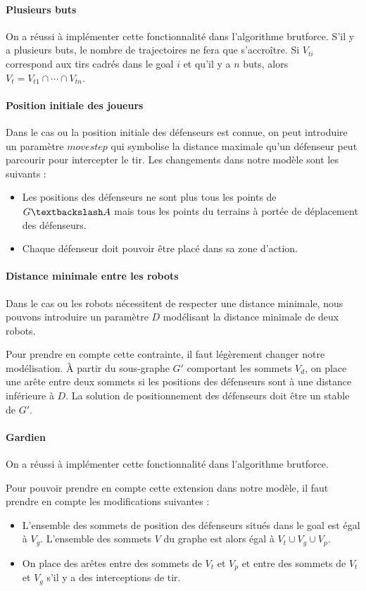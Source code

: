 \documentclass[12pt]{article}
\begin{document}
\paragraph{Plusieurs buts}
On a réussi à implémenter cette fonctionnalité dans l'algorithme brutforce. S'il y a plusieurs buts, le nombre de trajectoires ne fera que s'accroître. Si $V_{ti}$ correspond aux tirs cadrés dans le goal $i$ et qu'il y a $n$ buts, alors $V_t = V_{t1} \cap \cdots \cap V_{tn}$.


\paragraph{Position initiale des joueurs}
Dans le cas ou la position initiale des défenseurs est connue, on peut introduire un paramètre $movestep$ qui symbolise la distance maximale qu'un défenseur peut parcourir pour intercepter le tir. Les changements dans notre modèle sont les suivants :

\begin{itemize}
  \item Les positions des défenseurs ne sont plus tous les points de $G \textbackslash A$ mais tous les points du terrains à portée de déplacement des défenseurs.
  \item Chaque défenseur doit pouvoir être placé dans sa zone d'action.
\end{itemize}

\paragraph{Distance minimale entre les robots}
Dans le cas ou les robots nécessitent de respecter une distance minimale, nous pouvons introduire un paramètre $D$ modélisant la distance minimale de deux robots.

Pour prendre en compte cette contrainte, il faut légèrement changer notre modélisation. À partir du sous-graphe $G'$ comportant les sommets $V_d$, on place une arête entre deux sommets si les positions des défenseurs sont à une distance inférieure à $D$. La solution de positionnement des défenseurs doit être un stable de $G'$.


\paragraph{Gardien}
On a réussi à implémenter cette fonctionnalité dans l'algorithme brutforce.

Pour pouvoir prendre en compte cette extension dans notre modèle, il faut prendre en compte les modifications suivantes :
\begin{itemize}
  \item L'ensemble des sommets de position des défenseurs situés dans le goal est égal à $V_g$. L'ensemble des sommets $V$ du graphe est alors égal à $V_t \cup V_g \cup V_p$.
  \item On place des arêtes entre des sommets de $V_t$ et $V_p$ et entre des sommets de $V_t$ et $V_g$ s'il y a des interceptions de tir.
\end{itemize}
\end{document}
